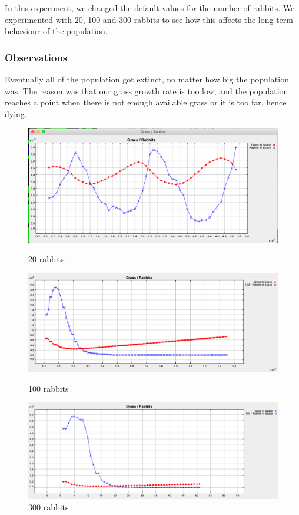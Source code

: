 \documentclass[11pt]{article}
\begin{document}
In this experiment, we changed the default values for the number of rabbits. We experimented with 20, 100 and 300 rabbits to see how this affects the long term behaviour of the population.

\subsubsection{Observations}

Eventually all of the population got extinct, no matter how big the population was. The reason was that our grass growth rate is too low, and the population reaches a point when there is not enough available grass or it is too far, hence dying.

\begin{figure}[!htb]
  \includegraphics[width=\linewidth]{ex1-chart-20.png}
  \caption{20 rabbits}\label{fig:ex1-1}
\endminipage\hfill
{}
  \includegraphics[width=\linewidth]{ex1-chart-100.png}
  \caption{100 rabbits}\label{fig:ex1-2}
\endminipage\hfill
{}%
  \includegraphics[width=\linewidth]{ex1-chart-300.png}
  \caption{300 rabbits}\label{fig:ex1-3}
\endminipage
\end{figure}
\end{document}
